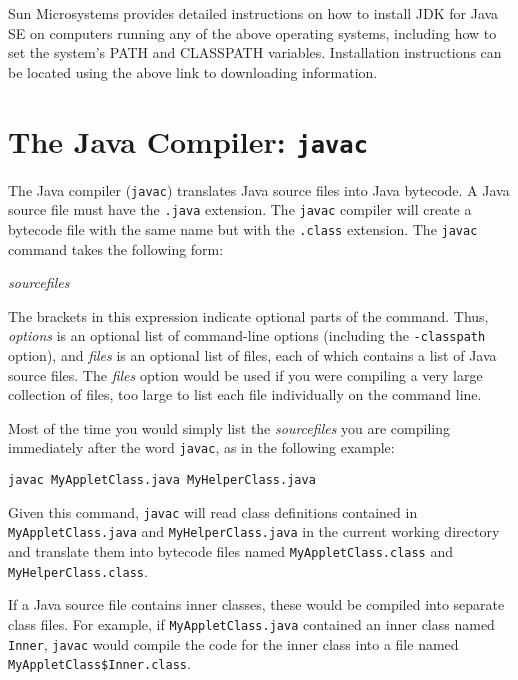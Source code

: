 \noindent Sun Microsystems provides detailed instructions on how
to install JDK for Java SE on computers running any of the above operating
systems, including how to set the system's PATH and CLASSPATH variables.
Installation instructions can be located using the above link to
downloading information.

\section*{The Java Compiler: {\tt javac}}
\label{the-java-compiler}
\noindent The Java compiler ({\tt javac}) translates Java source files into Java
bytecode.  A Java source file must have the {\tt .java} extension.   The
{\tt javac} compiler will create a bytecode file with the same name
but with the {\tt .class} extension.  The {\tt javac} command takes
the following form:

\vspace{6pt plus3pt minus2pt}
 \qquad 
 [ {\it options} ] \qquad 
 {\it sourcefiles} \qquad 
 [ {\it files} ]

\vspace{6pt plus3pt minus2pt}\noindent The brackets in this expression indicate optional parts of
the command.   Thus, {\it options} is an optional list of command-line options 
(including the {\tt -classpath} option), and
{\it files} is an optional list of files, each of which contains a
list of Java source files.   The {\it files} option would be used if
you were compiling a very large collection of files, too large to list
each file individually on the command line.

Most of the time you would simply list the {\it sourcefiles} you are
compiling immediately after the word {\tt javac}, as in the
following example:

\begin{jjjlisting}
\begin{lstlisting}
javac MyAppletClass.java MyHelperClass.java
\end{lstlisting}
\end{jjjlisting}

\noindent Given this command, {\tt javac} will read class
definitions contained in {\tt MyAppletClass.java} and {\tt MyHelperClass.java}
in the current working directory
and translate them into bytecode files named {\tt MyAppletClass.class} and
{\tt MyHelperClass.class}.

If a Java source file contains inner classes, these would be compiled
into separate class files.  For example, if {\tt MyAppletClass.java}
contained an inner class named {\tt Inner}, {\tt javac} would compile
the code for the inner class into a file named {\tt
MyAppletClass\$Inner.class}.

